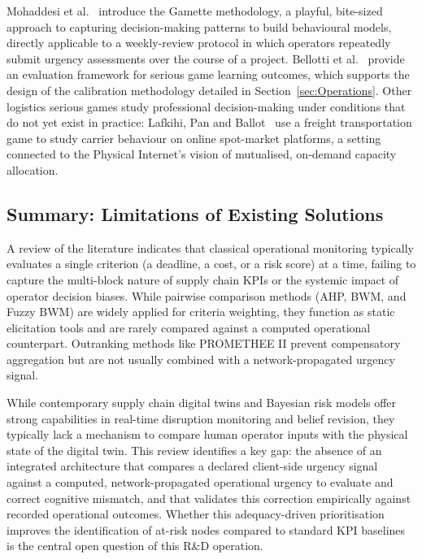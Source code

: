 Mohaddesi et al.~\autocite{mohaddesi2020gamettes} introduce the Gamette methodology, a playful, bite-sized approach to capturing decision-making patterns to build behavioural models, directly applicable to a weekly-review protocol in which operators repeatedly submit urgency assessments over the course of a project. Bellotti et al.~\autocite{bellotti2013framework} provide an evaluation framework for serious game learning outcomes, which supports the design of the calibration methodology detailed in Section~\ref{sec:Operations}. Other logistics serious games study professional decision-making under conditions that do not yet exist in practice: Lafkihi, Pan and Ballot~\autocite{lafkihi2025freight} use a freight transportation game to study carrier behaviour on online spot-market platforms, a setting connected to the Physical Internet's vision of mutualised, on-demand capacity allocation.


\subsection{Summary: Limitations of Existing Solutions}
\label{subsec:gaps}

A review of the literature indicates that classical operational monitoring typically evaluates a single criterion (a deadline, a cost, or a risk score) at a time, failing to capture the multi-block nature of supply chain KPIs or the systemic impact of operator decision biases. While pairwise comparison methods (AHP, BWM, and Fuzzy BWM) are widely applied for criteria weighting, they function as static elicitation tools and are rarely compared against a computed operational counterpart. Outranking methods like PROMETHEE II prevent compensatory aggregation but are not usually combined with a network-propagated urgency signal.

While contemporary supply chain digital twins and Bayesian risk models offer strong capabilities in real-time disruption monitoring and belief revision, they typically lack a mechanism to compare human operator inputs with the physical state of the digital twin. This review identifies a key gap: the absence of an integrated architecture that compares a declared client-side urgency signal against a computed, network-propagated operational urgency to evaluate and correct cognitive mismatch, and that validates this correction empirically against recorded operational outcomes. Whether this adequacy-driven prioritisation improves the identification of at-risk nodes compared to standard KPI baselines is the central open question of this R\&D operation.

